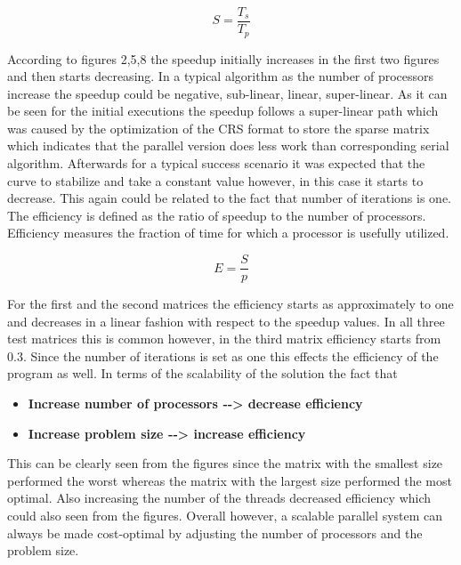 \documentclass[a4paper,11pt]{article}
\theoremstyle{mytheor}
\begin{document}
\begin{equation}
   S = \frac{T_s}{T_p}
\end{equation}

According to figures 2,5,8 the speedup initially increases in the first two figures and then starts decreasing. In a typical algorithm as the number of processors increase the speedup could be negative, sub-linear, linear, super-linear. As it can be seen for the initial executions the speedup follows a super-linear path which was caused by the optimization of the CRS format to store the sparse matrix which indicates that the parallel version does less work than corresponding serial algorithm. Afterwards for a typical success scenario it was expected that the curve to stabilize and take a constant value however, in this case it starts to decrease. This again could be related to the fact that number of iterations is one.
\newline
\newline
The efficiency is defined as the ratio of speedup to the number of processors. Efficiency measures the fraction of time for which a processor is usefully utilized.

\begin{equation}
   E = \frac{S}{p}
\end{equation}

For the first and the second matrices the efficiency starts as approximately to one and decreases in a linear fashion with respect to the speedup values. In all three test matrices this is common however, in the third matrix efficiency starts from 0.3. Since the number of iterations is set as one this effects the efficiency of the program as well.
\newline
\newline
In terms of the scalability of the solution the fact that
\begin{itemize}
    \item \textbf{Increase number of processors ‐‐> decrease efficiency}
    \item \textbf{Increase problem size ‐‐> increase efficiency}
\end{itemize}

This can be clearly seen from the figures since the matrix with the smallest size performed the worst whereas the matrix with the largest size performed the most optimal. Also increasing the number of the threads decreased efficiency which could also seen from the figures. Overall however, a scalable parallel system can always be made cost‐optimal by adjusting the number of processors and the problem size.
\end{document}
